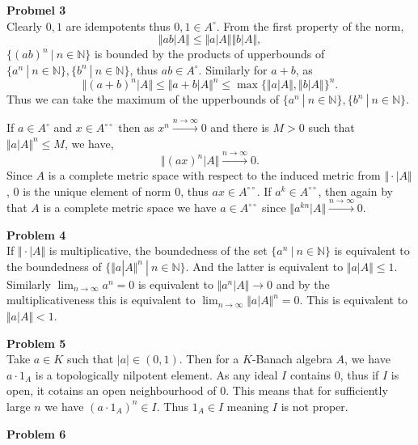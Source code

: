 \documentclass[10pt]{article}
\newcommand{\norm}[1]{\Vert #1 \Vert}
\newcommand{\N}[0]{\mathbb{N}}
\newcommand{\sep}[0]{\:|\:}
\begin{document}
\par\textbf{Probmel 3}\\
Clearly $0,1$ are idempotents thus $0,1\in A^\circ$. From the first property of the norm, 
\begin{equation*}
\norm{ab|A}\leq\norm{a|A}\norm{b|A},
\end{equation*}
$\{(ab)^n\sep n\in\N\}$ is bounded by the products of upperbounds of $\{a^n\sep n\in\N\},\{b^n\sep n\in\N\}$, thus $ab\in A^\circ$. Similarly for $a+b$, as
\begin{equation*}
    \norm{(a+b)^n|A}\leq \norm{a+b|A}^n\leq \max\{\norm{a|A},\norm{b|A}\}^n.
\end{equation*}
Thus we can take the maximum of the upperbounds of $\{a^n\sep n\in\N\},\{b^n\sep n\in\N\}$.
\par If $a\in A^\circ$ and $x\in A^{\circ\circ}$ then as $x^n\stackrel{n\to\infty}{\to}0$ and there is $M>0$ such that $\norm{a|A}^n\leq M$, we have,
\begin{equation*}
    \norm{(ax)^n|A}\stackrel{n\to\infty}{\to}0.
\end{equation*}
Since $A$ is a complete metric space with respect to the induced metric from $\norm{\cdot|A}$, $0$ is the unique element of norm $0$, thus $ax\in A^{\circ\circ}$. If $a^k\in A^{\circ\circ}$, then again by that $A$ is a complete metric space we have $a\in A^{\circ\circ}$ since $\norm{a^{kn}|A}\stackrel{n\to\infty}{\to}0$.\\
\par\textbf{Problem 4}\\
If $\norm{\cdot|A}$ is multiplicative, the boundedness of the set $\{a^n\sep n\in\N\}$ is equivalent to the boundedness of $\{\norm{a|A}^n\sep n\in\N\}$. And the latter is equivalent to $\norm{a|A}\leq 1$. Similarly $\lim_{n\to\infty}a^n=0$ is equivalent to $\norm{a^n|A}\to 0$ and by the multiplicativeness this is equivalent to $\lim_{n\to\infty}\norm{a|A}^n=0$. This is equivalent to $\norm{a|A}<1$.
\\\par\textbf{Problem 5}\\
Take $a\in K$ such that $\vert a \vert\in(0,1)$. Then for a $K$-Banach algebra $A$, we have $a\cdot 1_A$ is a topologically nilpotent element.
As any ideal $I$ contains $0$, thus if $I$ is open, it cotains an open neighbourhood of $0$. This means that for sufficiently large $n$ we have $(a\cdot 1_A)^n\in I$. Thus $1_A\in I$ meaning $I$ is not proper.
\\\par\textbf{Problem 6}
\end{document}
